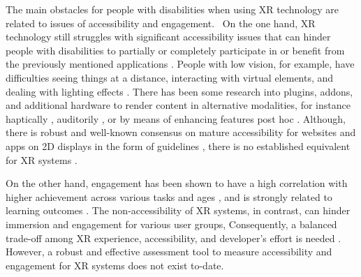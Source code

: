 \documentclass[11pt,english]{nik}
\begin{document}
The main obstacles for people with disabilities when using XR technology are related to issues of accessibility and
engagement. \ On the one hand, XR technology still struggles with significant accessibility issues that can hinder
people with disabilities to partially or completely participate in or benefit from the previously mentioned
applications \autocite{mott2019accessible,zhao2019seeingvr}. 
People with low vision, for example, have difficulties seeing things at a distance, interacting with
virtual elements, and dealing with lighting effects \autocite{zhao2019seeingvr}. 
There has been some research into plugins, addons, and
additional hardware to render content in alternative modalities, for instance haptically 
\autocite{DART-06-2014,10.1145/274497.274515,10.1007/978-3-319-94274-2_17,Lecuyer-etal-2003,zhao2019seeingvr},
auditorily \autocite{gonzalez-mora-etal-2006,PICINALI2014393,maidenbaum-etal-2013,OSullivan-etal-2015},
or by means of enhancing features post hoc \autocite{mott2019accessible}. Although, there is robust and
well-known consensus on mature accessibility for websites and apps on 2D displays in the form of
guidelines \autocite{android-guide,w3c-contrast,WCAG-21},
there is no established equivalent for XR systems \autocite{mott2019accessible,zhao2019seeingvr}. 

On the other hand, engagement has been shown to have a high correlation with higher achievement across various tasks and
ages \autocite{doi:10.3102/00346543074001059}, and is strongly related to learning
outcomes \autocite{doi:10.1080/13527250410001692877}. The non-accessibility of XR systems, in contrast, can
hinder immersion and engagement for various user groups, Consequently, a balanced trade-off among XR experience,
accessibility, and developer’s effort is needed \autocite{zhao2019seeingvr}. 
However, a robust and effective assessment tool to measure
accessibility and engagement for XR systems does not exist to-date.
\end{document}

